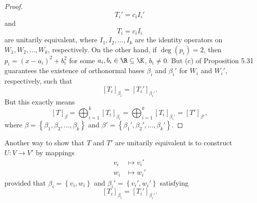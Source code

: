 \documentclass[linearalgebraII]{subfiles}
\begin{document}
\begin{proof}
        \begin{equation*}
            T_i' = c_iI_i'
        \end{equation*}
        and
        \begin{equation*}
            T_i = c_iI_i
        \end{equation*}
        are unitarily equivalent, where $I_1,I_2,\ldots,I_k$ are the identity operators on $W_1,W_2,\ldots,W_k$, respectively. On the other hand, if $\deg\left( p_i \right) = 2$, then $p_i = \left( x-a_i \right) ^{2} +b_i^{2}$ for some $a_i,b_i\in\R\subseteq\K$, $b_i\neq 0$. But (c) of Proposition 5.31 guarantees the existence of orthonormal bases $\beta_i$ and $\beta_i'$ for $W_i$ and $W_i'$, respectively, such that
        \begin{equation*}
            \left[ T_i \right] _{\beta_i} = \left[ T_i' \right] _{\beta_i'}.
        \end{equation*}
        But this exactly means
        \begin{equation*}
            \left[ T \right] _\beta = \bigoplus^{k}_{i=1} \left[ T_i \right] _{\beta_i} = \bigoplus^{k}_{i=1} \left[ T_i \right] _{\beta_i'} = \left[ T' \right] _{\beta'},
        \end{equation*}
        where $\beta = \left\lbrace \beta_1,\beta_2,\ldots,\beta_k \right\rbrace$ and $\beta' = \left\lbrace \beta_1', \beta_2', \ldots, \beta_k' \right\rbrace$. 
    \end{proof}

    \begin{remark}
        Another way to show that $T$ and $T'$ are unitarily equivalent is to construct $U:V\to V'$ by mappings
        \begin{align*}
            v_i&\mapsto v_i' \\
            w_i&\mapsto w_i'
        \end{align*} 
        provided that $\beta_i = \left\lbrace v_i,w_i \right\rbrace$ and $\beta_i'=\left\lbrace v_i',w_i' \right\rbrace$ satisfying
        \begin{equation*}
            \left[ T_i \right] _{\beta_i} = \left[ T_i' \right] _{\beta_i'}.
        \end{equation*}
    \end{remark}
\end{document}
